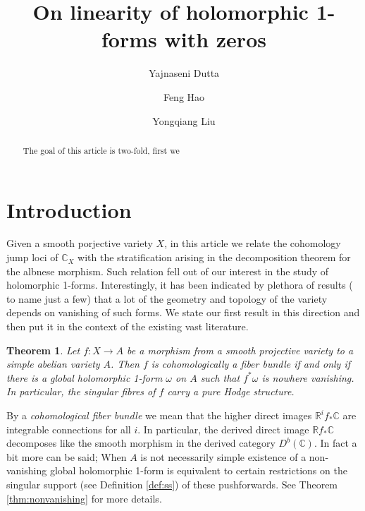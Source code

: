 \documentclass[12pt,reqno]{amsart}
\title{}
\newtheorem{alphtheorem}{Theorem}
\theoremstyle{question}
\theoremstyle{definition}
\theoremstyle{remark}
\theoremstyle{cited}
\theoremstyle{citeddef}
\newcommand{\bbC}{\mathbb{C}}
\newcommand{\bbR}{\mathbb{R}}
\begin{document}
  
\title[Cohomology jump loci and holomorphic 1-forms with zeros]{On linearity of holomorphic 1-forms with zeros} 

\author{Yajnaseni Dutta}


\author{Feng Hao}


\author{Yongqiang Liu}






\begin{abstract} 
The goal of this article is two-fold, first we 
\end{abstract}

\maketitle
\section{Introduction}\label{intro}
Given a smooth porjective variety $X$, in this article we relate the cohomology jump loci of $\bbC_X$ with the 
stratification arising in the decomposition theorem for the albnese morphism. Such relation fell out of our interest in the
study of holomorphic 1-forms. Interestingly, it has been indicated by plethora of results
(\cite{GL87, HK05, LZ05,
SS19, HS19, PS14} to name just a few) that a lot of the geometry and topology of the
variety depends on vanishing of such forms. We state our first result in this direction
and then put it in the context of the existing vast literature.



\begin{alphtheorem}\label{thm:smooth}
Let $f:X\to A$ be a morphism from a smooth projective variety to a simple abelian variety $A$. Then $f$ is cohomologically a fiber bundle if and only if there is a global holomorphic 1-form $\omega$ on $A$ such that $f^*\omega$ is nowhere vanishing.  In particular, the
singular fibres of $f$ carry a pure Hodge structure.
\end{alphtheorem}

By a \textsl{cohomological fiber bundle} we mean that the higher direct
images $\bbR^if_*\bbC$ are integrable connections for all $i$. In particular, the derived direct image
$\bbR f_*\bbC$ decomposes like the smooth morphism in the derived category $D^b(\bbC)$. In fact a bit more can be said; When $A$ is not necessarily simple existence of a non-vanishing global holomorphic 1-form
is equivalent to certain restrictions on the singular support 
(see Definition \ref{def:ss}) of 
these pushforwards. See Theorem \ref{thm:nonvanishing} for more details.
\end{document}
